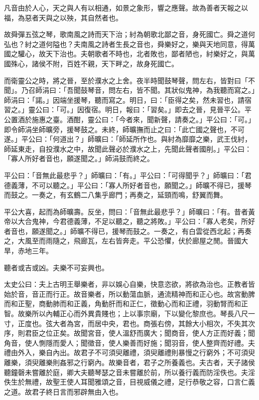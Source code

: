 \begin{pinyinscope}
凡音由於人心，天之與人有以相通，如景之象形，響之應聲。故為善者天報之以福，為惡者天與之以殃，其自然者也。

故舜彈五弦之琴，歌南風之詩而天下治；紂為朝歌北鄙之音，身死國亡。舜之道何弘也？紂之道何隘也？夫南風之詩者生長之音也，舜樂好之，樂與天地同意，得萬國之驩心，故天下治也。夫朝歌者不時也，北者敗也，鄙者陋也，紂樂好之，與萬國殊心，諸侯不附，百姓不親，天下畔之，故身死國亡。

而衛靈公之時，將之晉，至於濮水之上舍。夜半時聞鼓琴聲，問左右，皆對曰「不聞」。乃召師涓曰：「吾聞鼓琴音，問左右，皆不聞。其狀似鬼神，為我聽而寫之。」師涓曰：「諾。」因端坐援琴，聽而寫之。明日，曰：「臣得之矣，然未習也，請宿習之。」靈公曰：「可。」因復宿。明日，報曰：「習矣。」即去之晉，見晉平公。平公置酒於施惠之臺。酒酣，靈公曰：「今者來，聞新聲，請奏之。」平公曰：「可。」即令師涓坐師曠旁，援琴鼓之。未終，師曠撫而止之曰：「此亡國之聲也，不可遂。」平公曰：「何道出？」師曠曰：「師延所作也。與紂為靡靡之樂，武王伐紂，師延東走，自投濮水之中，故聞此聲必於濮水之上，先聞此聲者國削。」平公曰：「寡人所好者音也，願遂聞之。」師涓鼓而終之。

平公曰：「音無此最悲乎？」師曠曰：「有。」平公曰：「可得聞乎？」師曠曰：「君德義薄，不可以聽之。」平公曰：「寡人所好者音也，願聞之。」師曠不得已，援琴而鼓之。一奏之，有玄鶴二八集乎廊門；再奏之，延頸而鳴，舒翼而舞。

平公大喜，起而為師曠壽。反坐，問曰：「音無此最悲乎？」師曠曰：「有。昔者黃帝以大合鬼神，今君德義薄，不足以聽之，聽之將敗。」平公曰：「寡人老矣，所好者音也，願遂聞之。」師曠不得已，援琴而鼓之。一奏之，有白雲從西北起；再奏之，大風至而雨隨之，飛廊瓦，左右皆奔走。平公恐懼，伏於廊屋之閒。晉國大旱，赤地三年。

聽者或吉或凶。夫樂不可妄興也。

太史公曰：夫上古明王舉樂者，非以娛心自樂，快意恣欲，將欲為治也。正教者皆始於音，音正而行正。故音樂者，所以動蕩血脈，通流精神而和正心也。故宮動脾而和正聖，商動肺而和正義，角動肝而和正仁，徵動心而和正禮，羽動腎而和正智。故樂所以內輔正心而外異貴賤也；上以事宗廟，下以變化黎庶也。琴長八尺一寸，正度也。弦大者為宮，而居中央，君也。商張右傍，其餘大小相次，不失其次序，則君臣之位正矣。故聞宮音，使人溫舒而廣大；聞商音，使人方正而好義；聞角音，使人惻隱而愛人；聞徵音，使人樂善而好施；聞羽音，使人整齊而好禮。夫禮由外入，樂自內出。故君子不可須臾離禮，須臾離禮則暴慢之行窮外；不可須臾離樂，須臾離樂則姦邪之行窮內。故樂音者，君子之所養義也。夫古者，天子諸侯聽鐘磬未嘗離於庭，卿大夫聽琴瑟之音未嘗離於前，所以養行義而防淫佚也。夫淫佚生於無禮，故聖王使人耳聞雅頌之音，目視威儀之禮，足行恭敬之容，口言仁義之道。故君子終日言而邪辟無由入也。


\end{pinyinscope}